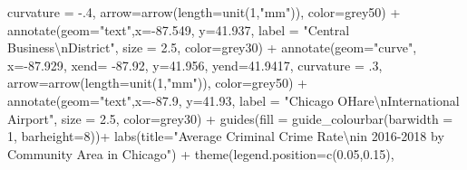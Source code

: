\documentclass[
]{report}
\newenvironment{Shaded}{}{}
\newcommand{\AttributeTok}[1]{\textcolor[rgb]{0.65,0.15,0.64}{#1}}
\newcommand{\DecValTok}[1]{\textcolor[rgb]{0.60,0.41,0.00}{#1}}
\newcommand{\FloatTok}[1]{\textcolor[rgb]{0.60,0.41,0.00}{#1}}
\newcommand{\FunctionTok}[1]{\textcolor[rgb]{0.25,0.47,0.95}{#1}}
\newcommand{\NormalTok}[1]{\textcolor[rgb]{0.22,0.23,0.26}{#1}}
\newcommand{\SpecialCharTok}[1]{\textcolor[rgb]{0.00,0.52,0.74}{#1}}
\newcommand{\StringTok}[1]{\textcolor[rgb]{0.31,0.63,0.31}{#1}}
\begin{document}
\begin{Shaded}
\begin{Highlighting}[]
           \AttributeTok{curvature =} \SpecialCharTok{{-}}\NormalTok{.}\DecValTok{4}\NormalTok{, }\AttributeTok{arrow=}\FunctionTok{arrow}\NormalTok{(}\AttributeTok{length=}\FunctionTok{unit}\NormalTok{(}\DecValTok{1}\NormalTok{,}\StringTok{"mm"}\NormalTok{)), }\AttributeTok{color=}\StringTok{\textquotesingle{}grey50\textquotesingle{}}\NormalTok{) }\SpecialCharTok{+}
  \FunctionTok{annotate}\NormalTok{(}\AttributeTok{geom=}\StringTok{"text"}\NormalTok{,}\AttributeTok{x=}\SpecialCharTok{{-}}\FloatTok{87.549}\NormalTok{, }\AttributeTok{y=}\FloatTok{41.937}\NormalTok{, }\AttributeTok{label =} \StringTok{"Central Business}\SpecialCharTok{\textbackslash{}n}\StringTok{District"}\NormalTok{,}
           \AttributeTok{size =} \FloatTok{2.5}\NormalTok{, }\AttributeTok{color=}\StringTok{\textquotesingle{}grey30\textquotesingle{}}\NormalTok{) }\SpecialCharTok{+}
  \FunctionTok{annotate}\NormalTok{(}\AttributeTok{geom=}\StringTok{"curve"}\NormalTok{, }\AttributeTok{x=}\SpecialCharTok{{-}}\FloatTok{87.929}\NormalTok{, }\AttributeTok{xend=} \SpecialCharTok{{-}}\FloatTok{87.92}\NormalTok{, }\AttributeTok{y=}\FloatTok{41.956}\NormalTok{, }\AttributeTok{yend=}\FloatTok{41.9417}\NormalTok{,}
           \AttributeTok{curvature =}\NormalTok{ .}\DecValTok{3}\NormalTok{, }\AttributeTok{arrow=}\FunctionTok{arrow}\NormalTok{(}\AttributeTok{length=}\FunctionTok{unit}\NormalTok{(}\DecValTok{1}\NormalTok{,}\StringTok{"mm"}\NormalTok{)), }\AttributeTok{color=}\StringTok{\textquotesingle{}grey50\textquotesingle{}}\NormalTok{) }\SpecialCharTok{+}
  \FunctionTok{annotate}\NormalTok{(}\AttributeTok{geom=}\StringTok{"text"}\NormalTok{,}\AttributeTok{x=}\SpecialCharTok{{-}}\FloatTok{87.9}\NormalTok{, }\AttributeTok{y=}\FloatTok{41.93}\NormalTok{, }\AttributeTok{label =} \StringTok{"Chicago O\textquotesingle{}Hare}\SpecialCharTok{\textbackslash{}n}\StringTok{International Airport"}\NormalTok{,}
           \AttributeTok{size =} \FloatTok{2.5}\NormalTok{, }\AttributeTok{color=}\StringTok{\textquotesingle{}grey30\textquotesingle{}}\NormalTok{) }\SpecialCharTok{+}
  \FunctionTok{guides}\NormalTok{(}\AttributeTok{fill =} \FunctionTok{guide\_colourbar}\NormalTok{(}\AttributeTok{barwidth =} \DecValTok{1}\NormalTok{, }\AttributeTok{barheight=}\DecValTok{8}\NormalTok{))}\SpecialCharTok{+}
  \FunctionTok{labs}\NormalTok{(}\AttributeTok{title=}\StringTok{"Average Criminal Crime Rate}\SpecialCharTok{\textbackslash{}n}\StringTok{in 2016{-}2018 by Community Area in Chicago"}\NormalTok{) }\SpecialCharTok{+}
  \FunctionTok{theme}\NormalTok{(}\AttributeTok{legend.position=}\FunctionTok{c}\NormalTok{(}\FloatTok{0.05}\NormalTok{,}\FloatTok{0.15}\NormalTok{), }

\end{Highlighting}
\end{Shaded}
\end{document}
